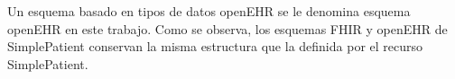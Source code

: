 Un esquema basado en tipos de datos openEHR se le denomina esquema openEHR en este trabajo. Como se observa, los esquemas FHIR y openEHR de SimplePatient conservan la misma estructura que la definida por el recurso SimplePatient.

